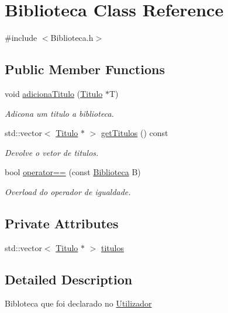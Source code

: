 \hypertarget{class_biblioteca}{}\section{Biblioteca Class Reference}
\label{class_biblioteca}


{\ttfamily \#include $<$Biblioteca.\+h$>$}

\subsection*{Public Member Functions}
\begin{DoxyCompactItemize}
\item 
void \mbox{\hyperlink{class_biblioteca_af10c9f23d85db8e03ae2e8b9d3e593e1}{adiciona\+Titulo}} (\mbox{\hyperlink{class_titulo}{Titulo}} $\ast$T)
\begin{DoxyCompactList}\small\item\em Adicona um titulo a biblioteca. \end{DoxyCompactList}\item 
std\+::vector$<$ \mbox{\hyperlink{class_titulo}{Titulo}} $\ast$ $>$ \mbox{\hyperlink{class_biblioteca_a03c1ebf76a4ace4f57000bb99a87bb88}{get\+Titulos}} () const
\begin{DoxyCompactList}\small\item\em Devolve o vetor de titulos. \end{DoxyCompactList}\item 
bool \mbox{\hyperlink{class_biblioteca_a962423a2d93507ad7348e9b8c83eb1b8}{operator==}} (const \mbox{\hyperlink{class_biblioteca}{Biblioteca}} B)
\begin{DoxyCompactList}\small\item\em Overload do operador de igualdade. \end{DoxyCompactList}\end{DoxyCompactItemize}
\subsection*{Private Attributes}
\begin{DoxyCompactItemize}
\item 
std\+::vector$<$ \mbox{\hyperlink{class_titulo}{Titulo}} $\ast$ $>$ \mbox{\hyperlink{class_biblioteca_a6aed0a1d07752adc3e74939b2128ed5e}{titulos}}
\end{DoxyCompactItemize}


\subsection{Detailed Description}
Bibloteca que foi declarado no \mbox{\hyperlink{class_utilizador}{Utilizador}} 

